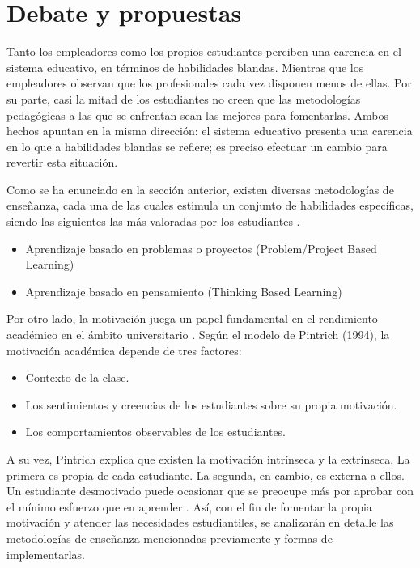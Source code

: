 \documentclass[conference]{IEEEtran}
\begin{document}
\section{Debate y propuestas}
\label{scrivauto:15}

Tanto los empleadores como los propios estudiantes perciben una carencia en el sistema educativo, en términos de habilidades blandas. Mientras que los empleadores observan que los profesionales cada vez disponen menos de ellas. Por su parte, casi la mitad de los estudiantes no creen que las metodologías pedagógicas a las que se enfrentan sean las mejores para fomentarlas. Ambos hechos apuntan en la misma dirección: el sistema educativo presenta una carencia en lo que a habilidades blandas se refiere; es preciso efectuar un cambio para revertir esta situación.

Como se ha enunciado en la sección anterior, existen diversas metodologías de enseñanza, cada una de las cuales estimula un conjunto de habilidades específicas, siendo las siguientes las más valoradas por los estudiantes \cite{b2}.

\begin{itemize}
    \item Aprendizaje basado en problemas o proyectos (Problem/Project Based Learning)
    \item Aprendizaje basado en pensamiento (Thinking Based Learning)
\end{itemize}

Por otro lado, la motivación juega un papel fundamental en el rendimiento académico en el ámbito universitario \cite{b11}. Según el modelo de Pintrich (1994), la motivación académica depende de tres factores:

\begin{itemize}
    \item Contexto de la clase.
    \item Los sentimientos y creencias de los estudiantes sobre su propia motivación.
    \item Los comportamientos observables de los estudiantes.
\end{itemize}

A su vez, Pintrich explica que existen la motivación intrínseca y la extrínseca. La primera es propia de cada estudiante. La segunda, en cambio, es externa a ellos. Un estudiante desmotivado puede ocasionar que se preocupe más por aprobar con el mínimo esfuerzo que en aprender \cite{b11}. Así, con el fin de fomentar la propia motivación y atender las necesidades estudiantiles, se analizarán en detalle las metodologías de enseñanza mencionadas previamente y formas de implementarlas.
\end{document}
